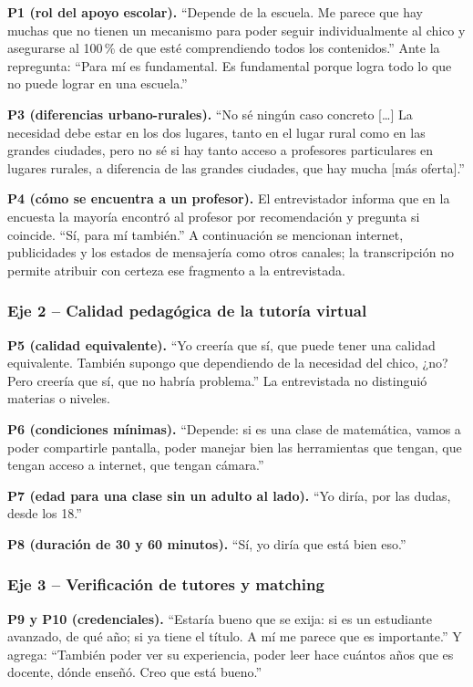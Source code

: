 \textbf{P1 (rol del apoyo escolar).} ``Depende de la escuela. Me parece
que hay muchas que no tienen un mecanismo para poder seguir
individualmente al chico y asegurarse al 100\,\% de que esté
comprendiendo todos los contenidos.'' Ante la repregunta: ``Para mí es
fundamental. Es fundamental porque logra todo lo que no puede lograr en
una escuela.''

\textbf{P3 (diferencias urbano-rurales).} ``No sé ningún caso concreto
[\ldots] La necesidad debe estar en los dos lugares, tanto en el lugar
rural como en las grandes ciudades, pero no sé si hay tanto acceso a
profesores particulares en lugares rurales, a diferencia de las grandes
ciudades, que hay mucha [más oferta].''

\textbf{P4 (cómo se encuentra a un profesor).} El entrevistador informa
que en la encuesta la mayoría encontró al profesor por recomendación y
pregunta si coincide. ``Sí, para mí también.'' A continuación se
mencionan internet, publicidades y los estados de mensajería como otros
canales; la transcripción no permite atribuir con certeza ese fragmento a
la entrevistada.

\subsubsection*{Eje 2 -- Calidad pedagógica de la tutoría virtual}

\textbf{P5 (calidad equivalente).} ``Yo creería que sí, que puede tener
una calidad equivalente. También supongo que dependiendo de la necesidad
del chico, ¿no? Pero creería que sí, que no habría problema.'' La
entrevistada no distinguió materias o niveles.

\textbf{P6 (condiciones mínimas).} ``Depende: si es una clase de
matemática, vamos a poder compartirle pantalla, poder manejar bien las
herramientas que tengan, que tengan acceso a internet, que tengan
cámara.''

\textbf{P7 (edad para una clase sin un adulto al lado).} ``Yo diría, por
las dudas, desde los 18.''

\textbf{P8 (duración de 30 y 60 minutos).} ``Sí, yo diría que está bien
eso.''

\subsubsection*{Eje 3 -- Verificación de tutores y matching}

\textbf{P9 y P10 (credenciales).} ``Estaría bueno que se exija: si es un
estudiante avanzado, de qué año; si ya tiene el título. A mí me parece
que es importante.'' Y agrega: ``También poder ver su experiencia, poder
leer hace cuántos años que es docente, dónde enseñó. Creo que está
bueno.''

